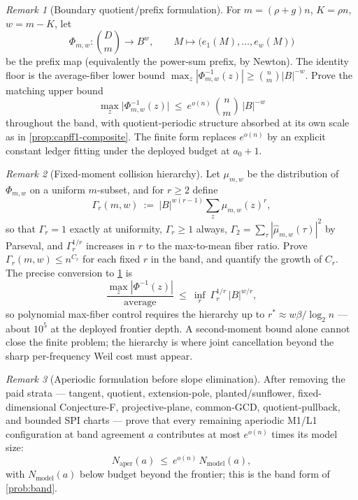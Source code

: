 \documentclass[11pt]{article}
\theoremstyle{definition}
\theoremstyle{remark}
\newtheorem{remark}[remark]{Remark}
\newcommand{\B}{B}
\begin{document}
\begin{remark}[Boundary quotient/prefix formulation]\label{prob:capfp-Q}
For $m=(\rho+g)n$, $K=\rho n$, $w=m-K$, let
\[
        \Phi_{m,w}:\binom Dm\to\B^w,\qquad M\mapsto\bigl(e_1(M),\ldots,e_w(M)\bigr)
\]
be the prefix map \textup(equivalently the power-sum prefix, by Newton\textup).  The identity floor is the average-fiber lower bound $\max_z|\Phi_{m,w}^{-1}(z)|\ge\binom nm|\B|^{-w}$.  Prove the matching upper bound
\[
        \max_z\bigl|\Phi_{m,w}^{-1}(z)\bigr|\ \le\ e^{o(n)}\,\binom nm\,|\B|^{-w}
\]
throughout the band, with quotient-periodic structure absorbed at its own scale as in \cref{prop:capff1-composite}.  The finite form replaces $e^{o(n)}$ by an explicit constant ledger fitting under the deployed budget at $a_0+1$.
\end{remark}

\begin{remark}[Fixed-moment collision hierarchy]\label{prob:capfp-gamma}
Let $\mu_{m,w}$ be the distribution of $\Phi_{m,w}$ on a uniform $m$-subset, and for $r\ge2$ define
\[
        \Gamma_r(m,w)\ :=\ |\B|^{w(r-1)}\sum_{z}\mu_{m,w}(z)^r,
\]
so that $\Gamma_r=1$ exactly at uniformity, $\Gamma_r\ge1$ always, $\Gamma_2=\sum_\tau|\widehat\mu_{m,w}(\tau)|^2$ by Parseval, and $\Gamma_r^{1/r}$ increases in $r$ to the max-to-mean fiber ratio.  Prove $\Gamma_r(m,w)\le n^{C_r}$ for each fixed $r$ in the band, and quantify the growth of $C_r$.  The precise conversion to \cref{prob:capfp-Q} is
\[
        \frac{\max_z|\Phi^{-1}(z)|}{\text{average}}\ \le\ \inf_r\ \Gamma_r^{1/r}\,|\B|^{w/r},
\]
so polynomial max-fiber control requires the hierarchy up to $r^*\approx w\beta/\log_2n$ --- about $10^5$ at the deployed frontier depth.  A second-moment bound alone cannot close the finite problem; the hierarchy is where joint cancellation beyond the sharp per-frequency Weil cost must appear.
\end{remark}

\begin{remark}[Aperiodic formulation before slope elimination]\label{prob:capfp-A}
After removing the paid strata --- tangent, quotient, extension-pole, planted/sunflower, fixed-dimensional Conjecture-F, projective-plane, common-GCD, quotient-pullback, and bounded SPI charts --- prove that every remaining aperiodic M1/L1 configuration at band agreement $a$ contributes at most $e^{o(n)}$ times its model size:
\[
        N_{\mathrm{aper}}(a)\ \le\ e^{o(n)}\,N_{\mathrm{model}}(a),
\]
with $N_{\mathrm{model}}(a)$ below budget beyond the frontier; this is the band form of \cref{prob:band}.
\end{remark}
\end{document}
